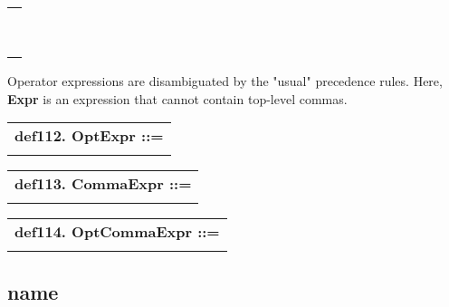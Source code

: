 \documentclass{report}
\begin{document}
\begin{tabular}{l}
\hspace*{3mm}{\tt  $\mid$ "\{" CommaExpr "\}"} \\ 
\hspace*{3mm}{\tt  $\mid$ QuoteExpr} \\ 
\hspace*{3mm}{\tt  $\mid$ TryCatchExpr} \\ 
\hspace*{3mm}{\tt  $\mid$ IfExpr} \\ 
\hspace*{3mm}{\tt  $\mid$ RepeatExpr} \\ 
\hspace*{3mm}{\tt  $\mid$ ForExpr} \\ 
\hspace*{3mm}{\tt  $\mid$ SwitchExpr} \\ 
\hspace*{3mm}{\tt  $\mid$ VarDef} \\ 
\hspace*{3mm}{\tt  $\mid$ ProcedureDef} \\ 
\end{tabular}

Operator expressions are disambiguated by the "usual" precedence
rules. Here, {\bf Expr} is an expression that cannot contain top-level
commas.

\begin{tabular}{l}
{\bf def112. OptExpr ::= }\\ 
\hspace*{3mm}{\tt {[}(Expr){]}} \\ 
\end{tabular}

\begin{tabular}{l}
{\bf def113. CommaExpr ::= }\\ 
\hspace*{3mm}{\tt Expr++ ","} \\ 
\end{tabular}

\begin{tabular}{l}
{\bf def114. OptCommaExpr ::= }\\ 
\hspace*{3mm}{\tt {[}(CommaExpr){]}} \\ 
\end{tabular}

\subsection{name}
\end{document}
